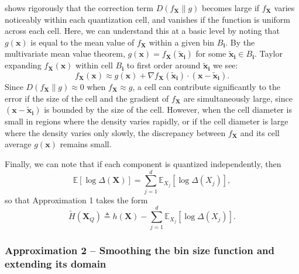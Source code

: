 \documentclass[12pt,onecolumn, margin=1in]{IEEEtran}
\begin{document}
\cite{kostina_data_2017} shows rigorously that the correction term $D(f_{\mathbf{X}}\|g)$ becomes large if $f_{\mathbf{X}}$ varies noticeably within each quantization cell, and vanishes if the function is uniform across each cell. Here, we can understand this at a basic level by noting that $g(\mathbf{x})$ is equal to the mean value of $f_{\mathbf{X}}$ within a given bin $B_{\mathbf{i}}$. By the multivariate mean value theorem, $g(\mathbf{x}) = f_\mathbf{X}(\mathbf{\tilde x_{\mathbf{i}}})$ for some $\mathbf{\tilde x}_{\mathbf{i}} \in B_{\mathbf{i}}$. Taylor expanding $f_{\mathbf{X}}(\mathbf{x})$ within cell $B_{\mathbf{i}}$ to first order around $\mathbf{\tilde x}_{\mathbf{i}}$ we see:
\begin{equation}
f_{\mathbf{X}}(\mathbf{x}) \approx g (\mathbf{x})+ \nabla f_{\mathbf{X}}(\mathbf{\tilde x}_{\mathbf{i}}) \cdot (\mathbf{x}- \mathbf{\tilde x}_{\mathbf{i}}).
\end{equation}
Since $D(f_{\mathbf{X}}\|g) \approx 0$ when $f_{\mathbf{X}} \approx g$, a cell can contribute significantly to the error if the size of the cell and the gradient of $f_{\mathbf{X}}$ are simultaneously large, since $(\mathbf{x}-\mathbf{\tilde x}_{\mathbf{i}})$ is bounded by the size of the cell. However, when the cell diameter is small in regions where the density varies rapidly, or if the cell diameter is large where the density varies only slowly, the discrepancy between $f_{\mathbf{X}}$ and its cell average $g(\mathbf{x})$ remains small.

Finally, we can note that if each component is quantized independently, then
\begin{equation}
\mathbb{E}[\log \Delta(\mathbf{X})]
=
\sum_{j=1}^{d}\mathbb{E}_{X_j}[\log \Delta(X_j)],
\label{eq:separable}
\end{equation}
so that Approximation 1 takes the form
\begin{equation}
\tilde{H}(\mathbf{X}_Q)
\triangleq
h(\mathbf{X})
-
\sum_{j=1}^{d}\mathbb{E}_{X_j}[\log \Delta(X_j)].
\label{eq:multi_var_diff_disc}
\end{equation}










\subsubsection*{Approximation 2 -- Smoothing the bin size function and extending its domain}\label{app:FPN_app2}
\end{document}
